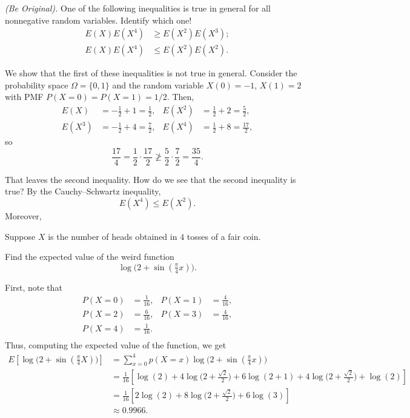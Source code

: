 \begin{problem}[Handout 7, \# 14]
  \emph{(Be Original).} One of the following inequalities is true in
  general for all nonnegative random variables. Identify which one!
  \begin{align*}
    E(X)E(X^4)&\geq E(X^2)E(X^3);\\
    E(X)E(X^4)&\leq E(X^2)E(X^2).
  \end{align*}
\end{problem}
\begin{solution}
  We show that the first of these inequalities is not true in
  general. Consider the probability space \(\Omega=\{0,1\}\) and the random
  variable \(X(0)=-1\), \(X(1)=2\) with PMF \(P(X=0)=P(X=1)=1/2\). Then,
  \begin{align*}
    E(X)&=-\frac{1}{2}+1=\frac{1}{2},&
    E(X^2)&=\frac{1}{2}+2=\frac{5}{2},\\
    E(X^3)&=-\frac{1}{2}+4=\frac{7}{2},&
    E(X^4)&=\frac{1}{2}+8=\frac{17}{2},
  \end{align*}
  so
  \[
    \frac{17}{4}=\frac{1}{2}\cdot\frac{17}{2}\ngeq
    \frac{5}{2}\cdot\frac{7}{2}=\frac{35}{4}.
  \]

  That leaves the second inequality. How do we see that the second
  inequality is true? By the Cauchy--Schwartz inequality,
  \[
    E(X^4)\leq E(X^2).
  \]
  Moreover,
\end{solution}
\newpage

\begin{problem}[Handout 7, \# 15]
  Suppose \(X\) is the number of heads obtained in \(4\) tosses of a fair
  coin.

  Find the expected value of the weird function
  \[
    \log\bigl( 2+\sin(\tfrac{\pi}{4}x) \bigr).
  \]
\end{problem}
\begin{solution}
  First, note that
  \begin{align*}
    P(X=0) &= \frac{1}{16},&
    P(X=1) &= \frac{4}{16},\\
    P(X=2) &= \frac{6}{16},&
    P(X=3) &= \frac{4}{16},\\
    P(X=4) &= \frac{1}{16}.\\
  \end{align*}
  Thus, computing the expected value of the function, we get
  \begin{align*}
    E\left[\log\bigl( 2+\sin(\tfrac{\pi}{4}X) \bigr)\right]
    &= \sum_{x=0}^4 p(X=x)\log\bigl( 2+\sin(\tfrac{\pi}{4}x) \bigr)\\
    &= \frac{1}{16} \left[\log(2) +4 \log \bigl(2+\tfrac{\sqrt{2}}{2}
      \bigr) +6 \log (2+1) +4 \log \bigl(2+\tfrac{\sqrt{2}}{2}
      \bigr) + \log(2)\right]\\
    &=\frac{1}{16} \left[2\log(2) +8 \log \bigl(2+\tfrac{\sqrt{2}}{2}
      \bigr) +6 \log (3) \right]\\
    &\approx 0.9966.
  \end{align*}
\end{solution}
\newpage

